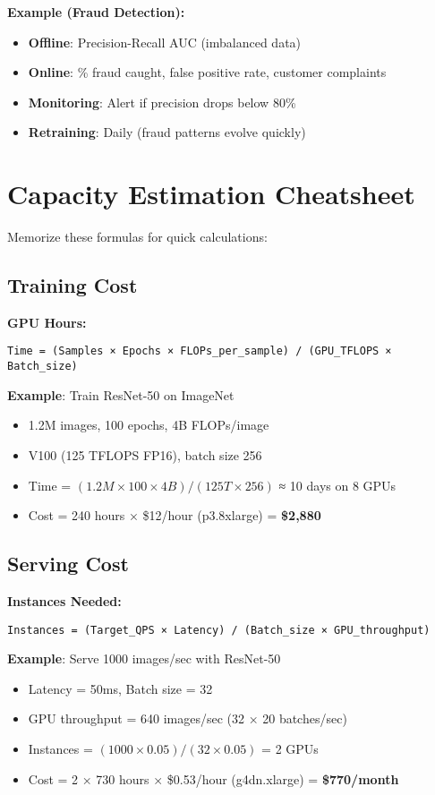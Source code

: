 \documentclass[10pt]{article}
\begin{document}
\textbf{Example (Fraud Detection):}
\begin{itemize}
\item \textbf{Offline}: Precision-Recall AUC (imbalanced data)
\item \textbf{Online}: \% fraud caught, false positive rate, customer complaints
\item \textbf{Monitoring}: Alert if precision drops below 80\%
\item \textbf{Retraining}: Daily (fraud patterns evolve quickly)
\end{itemize}

\section{Capacity Estimation Cheatsheet}

Memorize these formulas for quick calculations:

\subsection{Training Cost}

\textbf{GPU Hours:}
\begin{verbatim}
Time = (Samples × Epochs × FLOPs_per_sample) / (GPU_TFLOPS × Batch_size)
\end{verbatim}

\textbf{Example}: Train ResNet-50 on ImageNet
\begin{itemize}
\item 1.2M images, 100 epochs, 4B FLOPs/image
\item V100 (125 TFLOPS FP16), batch size 256
\item Time = $(1.2M \times 100 \times 4B) / (125T \times 256)$ ≈ 10 days on 8 GPUs
\item Cost = 240 hours × \$12/hour (p3.8xlarge) = \textbf{\$2,880}
\end{itemize}

\subsection{Serving Cost}

\textbf{Instances Needed:}
\begin{verbatim}
Instances = (Target_QPS × Latency) / (Batch_size × GPU_throughput)
\end{verbatim}

\textbf{Example}: Serve 1000 images/sec with ResNet-50
\begin{itemize}
\item Latency = 50ms, Batch size = 32
\item GPU throughput = 640 images/sec (32 × 20 batches/sec)
\item Instances = $(1000 \times 0.05) / (32 \times 0.05)$ = 2 GPUs
\item Cost = 2 × 730 hours × \$0.53/hour (g4dn.xlarge) = \textbf{\$770/month}
\end{itemize}
\end{document}

